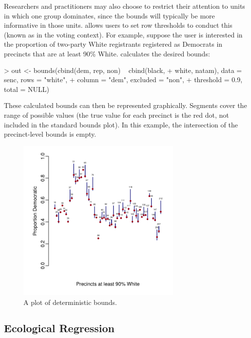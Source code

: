 Researchers and practitioners may also choose to restrict their
attention to units in which one group dominates, since the
bounds will typically be more informative in those units.  
allows users to set row thresholds to conduct this
 (known as  in the voting context).
For example, suppose the user is interested in the proportion of
two-party White registrants registered as Democrats in precincts that
are at least 90\% White.   calculates the desired bounds:
\begin{smallexample}
> out <- bounds(cbind(dem, rep, non) ~ cbind(black,
+   white, natam), data = senc, rows = "white", 
+   column = "dem", excluded = "non",
+   threshold = 0.9, total = NULL)
\end{smallexample} %
These calculated bounds can then be represented graphically.  Segments
cover the range of possible values (the true value for each precinct
is the red dot, not included in the standard bounds plot).  In this
example, the intersection of the precinct-level bounds is empty.
\begin{figure}[h!]
\begin{center}
\includegraphics[height=3.2in]{white.pdf}
\end{center}
\caption{A plot of deterministic bounds.}
\label{f:mob} 
\end{figure}
\subsection*{Ecological Regression}


